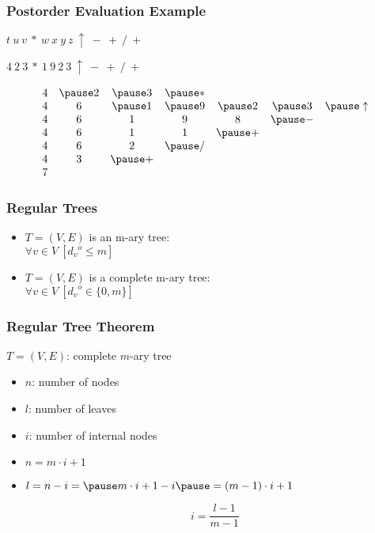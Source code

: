 \documentclass[dvipsnames]{beamer}
\begin{document}
\begin{frame}
  \frametitle{Postorder Evaluation Example}

  $t ~ u ~ v ~ * ~ w ~ x ~ y ~ z ~ \uparrow ~ - ~ + ~ / ~ +$

  $4 ~ 2 ~ 3 ~ * ~ 1 ~ 9 ~ 2 ~ 3 ~ \uparrow ~ - ~ + ~ / ~ +$

  \pause
  \medskip
  \[
    \begin{array}{ccccccc}
4 & \pause 2 & \pause 3 & \pause * &          &          &                \\
4 &        6 & \pause 1 & \pause 9 & \pause 2 & \pause 3 & \pause \uparrow\\
4 &        6 &        1 &        9 &        8 & \pause - &                \\
4 &        6 &        1 &        1 & \pause + &          &                \\
4 &        6 &        2 & \pause / &          &          &                \\
4 &        3 & \pause + &          &          &          &                \\
7 &          &          &          &          &          &                \\
    \end{array}
  \]
\end{frame}

\begin{frame}
  \frametitle{Regular Trees}

  \begin{itemize}
    \item $T=(V,E)$ is an \alert{m-ary tree}:\\
      $\forall v \in V~[{d_v}^o \leq m]$
    \item $T=(V,E)$ is a complete m-ary tree:\\
      $\forall v \in V~[{d_v}^o \in \{0,m\}]$
  \end{itemize}
\end{frame}

\begin{frame}
  \frametitle{Regular Tree Theorem}

  \begin{theorem}
    $T=(V,E)$: complete $m$-ary tree

    \begin{itemize}
      \item $n$: number of nodes
      \item $l$: number of leaves
      \item $i$: number of internal nodes
    \end{itemize}

    \pause
    \begin{itemize}
      \item $n = m \cdot i + 1$

      \pause
      \item  $l = n - i = \pause m \cdot i + 1 - i
        \pause = (m - 1) \cdot i + 1$

      \pause
      \[
        i = \frac{l - 1}{m - 1}
      \]
    \end{itemize}
  \end{theorem}
\end{frame}
\end{document}
